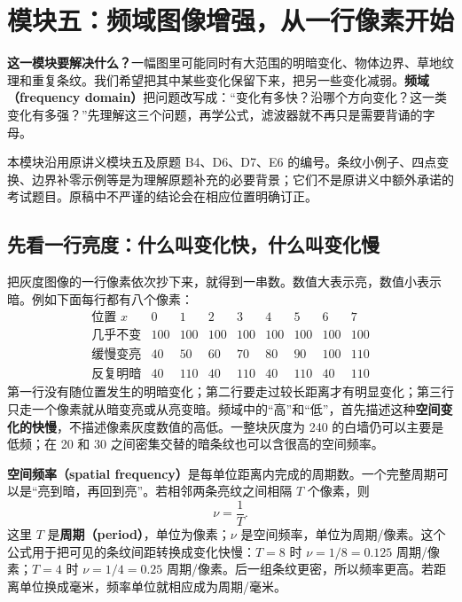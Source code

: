 \section{模块五：频域图像增强，从一行像素开始}

\noindent\textbf{这一模块要解决什么？}\quad 一幅图里可能同时有大范围的明暗变化、物体边界、草地纹理和重复条纹。我们希望把其中某些变化保留下来，把另一些变化减弱。\textbf{频域（frequency domain）}把问题改写成：“变化有多快？沿哪个方向变化？这一类变化有多强？”先理解这三个问题，再学公式，滤波器就不再只是需要背诵的字母。

本模块沿用原讲义模块五及原题 B4、D6、D7、E6 的编号。条纹小例子、四点变换、边界补零示例等是为理解原题补充的必要背景；它们不是原讲义中额外承诺的考试题目。原稿中不严谨的结论会在相应位置明确订正。

\subsection{先看一行亮度：什么叫变化快，什么叫变化慢}

把灰度图像的一行像素依次抄下来，就得到一串数。数值大表示亮，数值小表示暗。例如下面每行都有八个像素：
\[
\begin{array}{c|rrrrrrrr}
\text{位置 }x&0&1&2&3&4&5&6&7\\\hline
\text{几乎不变}&100&100&100&100&100&100&100&100\\
\text{缓慢变亮}&40&50&60&70&80&90&100&110\\
\text{反复明暗}&40&110&40&110&40&110&40&110
\end{array}
\]
第一行没有随位置发生的明暗变化；第二行要走过较长距离才有明显变化；第三行只走一个像素就从暗变亮或从亮变暗。频域中的“高”和“低”，首先描述这种\textbf{空间变化的快慢}，不描述像素灰度数值的高低。一整块灰度为 240 的白墙仍可以主要是低频；在 20 和 30 之间密集交替的暗条纹也可以含很高的空间频率。

\textbf{空间频率（spatial frequency）}是每单位距离内完成的周期数。一个完整周期可以是“亮到暗，再回到亮”。若相邻两条亮纹之间相隔 $T$ 个像素，则
\[
\nu=\frac{1}{T}.
\]
这里 $T$ 是\textbf{周期（period）}，单位为像素；$\nu$ 是空间频率，单位为周期/像素。这个公式用于把可见的条纹间距转换成变化快慢：$T=8$ 时 $\nu=1/8=0.125$ 周期/像素；$T=4$ 时 $\nu=1/4=0.25$ 周期/像素。后一组条纹更密，所以频率更高。若距离单位换成毫米，频率单位就相应成为周期/毫米。

